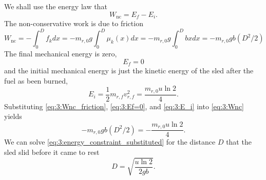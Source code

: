 \documentclass{esg8012exam}
\begin{document}
\begin{solution}
\begin{enumerate}[(a)]
      We shall use the energy law that
      \begin{equation} W_\text{nc} =E_f -E_i . \label{eq:3:Wnc} \end{equation}
      The non-conservative work is due to friction
      \begin{equation} W_\text{nc} =-\int_0^D {f_k } dx=-m_{r,0} g\int_0^D {\mu_k (x)} dx=-m_{r,0} g\int_0^D {bx} dx=-m_{r,0} gb(D^2/2) \label{eq:3:Wnc_friction} \end{equation}
      The final mechanical energy is zero, 
      \begin{equation} E_f =0 \label{eq:3:Ef=0} \end{equation}
      and the initial mechanical energy is just the kinetic energy of the sled after the fuel as been burned, 
      \begin{equation} E_i =\frac{1}{2}m_{r,f} v_{r,f}^2=\frac{m_{r,0} u\ln 2}{4}. \label{eq:3:E_i} \end{equation}
      Substituting \autoref{eq:3:Wnc_friction}, \autoref{eq:3:Ef=0}, and \autoref{eq:3:E_i} into \autoref{eq:3:Wnc} yields
      \begin{equation} -m_{r,0} gb(D^2/2)=-\frac{m_{r,0} u\ln 2}{4}. \label{eq:3:energy_constraint_substituted} \end{equation}
      We can solve \autoref{eq:3:energy_constraint_substituted} for the distance $D$ that the sled slid before it came to rest
      \begin{equation} D=\sqrt {\frac{u\ln 2}{2gb}} . \label{eq:3:D} \end{equation}
  \end{enumerate}
\end{solution}
\end{document}
